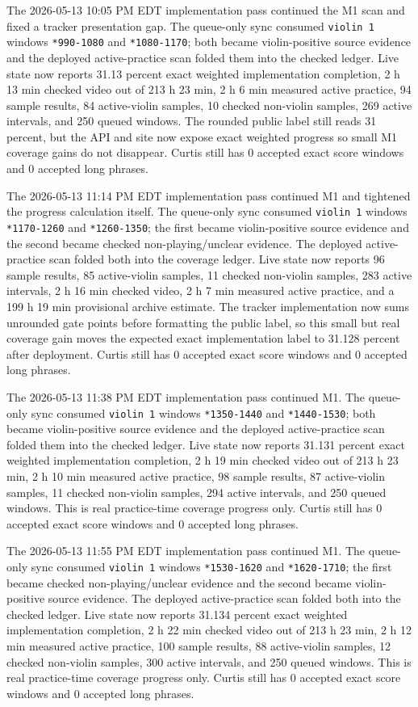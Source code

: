 The 2026-05-13 10:05 PM EDT implementation pass continued the M1 scan and fixed a tracker presentation gap. The queue-only sync consumed \texttt{violin 1} windows \texttt{*990-1080} and \texttt{*1080-1170}; both became violin-positive source evidence and the deployed active-practice scan folded them into the checked ledger. Live state now reports 31.13 percent exact weighted implementation completion, 2 h 13 min checked video out of 213 h 23 min, 2 h 6 min measured active practice, 94 sample results, 84 active-violin samples, 10 checked non-violin samples, 269 active intervals, and 250 queued windows. The rounded public label still reads 31 percent, but the API and site now expose exact weighted progress so small M1 coverage gains do not disappear. Curtis still has 0 accepted exact score windows and 0 accepted long phrases.

The 2026-05-13 11:14 PM EDT implementation pass continued M1 and tightened the progress calculation itself. The queue-only sync consumed \texttt{violin 1} windows \texttt{*1170-1260} and \texttt{*1260-1350}; the first became violin-positive source evidence and the second became checked non-playing/unclear evidence. The deployed active-practice scan folded both into the coverage ledger. Live state now reports 96 sample results, 85 active-violin samples, 11 checked non-violin samples, 283 active intervals, 2 h 16 min checked video, 2 h 7 min measured active practice, and a 199 h 19 min provisional archive estimate. The tracker implementation now sums unrounded gate points before formatting the public label, so this small but real coverage gain moves the expected exact implementation label to 31.128 percent after deployment. Curtis still has 0 accepted exact score windows and 0 accepted long phrases.

The 2026-05-13 11:38 PM EDT implementation pass continued M1. The queue-only sync consumed \texttt{violin 1} windows \texttt{*1350-1440} and \texttt{*1440-1530}; both became violin-positive source evidence and the deployed active-practice scan folded them into the checked ledger. Live state now reports 31.131 percent exact weighted implementation completion, 2 h 19 min checked video out of 213 h 23 min, 2 h 10 min measured active practice, 98 sample results, 87 active-violin samples, 11 checked non-violin samples, 294 active intervals, and 250 queued windows. This is real practice-time coverage progress only. Curtis still has 0 accepted exact score windows and 0 accepted long phrases.

The 2026-05-13 11:55 PM EDT implementation pass continued M1. The queue-only sync consumed \texttt{violin 1} windows \texttt{*1530-1620} and \texttt{*1620-1710}; the first became checked non-playing/unclear evidence and the second became violin-positive source evidence. The deployed active-practice scan folded both into the checked ledger. Live state now reports 31.134 percent exact weighted implementation completion, 2 h 22 min checked video out of 213 h 23 min, 2 h 12 min measured active practice, 100 sample results, 88 active-violin samples, 12 checked non-violin samples, 300 active intervals, and 250 queued windows. This is real practice-time coverage progress only. Curtis still has 0 accepted exact score windows and 0 accepted long phrases.

